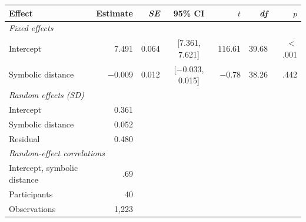 \begin{tabular}{lrrcrrr}
\toprule
Effect & Estimate & \textit{SE} & 95\% CI & $t$ & \textit{df} & $p$ \\
\midrule
\multicolumn{7}{l}{\textit{Fixed effects}} \\
\quad Intercept & 7.491 & 0.064 & [7.361, 7.621] & 116.61 & 39.68 & $<$.001 \\
\quad Symbolic distance & $-$0.009 & 0.012 & [$-$0.033, 0.015] & $-$0.78 & 38.26 & .442 \\
\multicolumn{7}{l}{\textit{Random effects (SD)}} \\
\quad Intercept & 0.361 \\
\quad Symbolic distance & 0.052 \\
\quad Residual & 0.480 \\
\multicolumn{7}{l}{\textit{Random-effect correlations}} \\
\quad Intercept, symbolic distance & .69 \\
\midrule
Participants & 40 \\
Observations & 1,223 \\
\bottomrule
\end{tabular}
